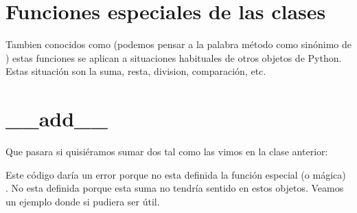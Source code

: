 \documentclass[a4paper,12pt,spanish]{sphinxmanual}
\begin{document}
\sphinxstepscope


\chapter{Funciones especiales de las clases}
\label{\detokenize{class-extras:funciones-especiales-de-las-clases}}\label{\detokenize{class-extras::doc}}
\sphinxAtStartPar
Tambien conocidos como  (podemos pensar a la palabra método como
sinónimo de ) estas funciones se aplican a situaciones habituales de otros
objetos de Python. Estas situación son la suma, resta, division, comparación, etc.


\chapter{\_\_add\_\_}
\label{\detokenize{class-extras:add}}
\sphinxAtStartPar
Que pasara si quisiéramos sumar dos  tal como las vimos en la clase anterior:

\begin{sphinxVerbatim}[commandchars=\\\{\}]
   
   

    
\end{sphinxVerbatim}

\sphinxAtStartPar
Este código daría un error porque no esta definida la función especial (o mágica) .
No esta definida porque esta suma no tendría sentido en estos objetos.
Veamos un ejemplo donde si pudiera ser útil.
\end{document}

